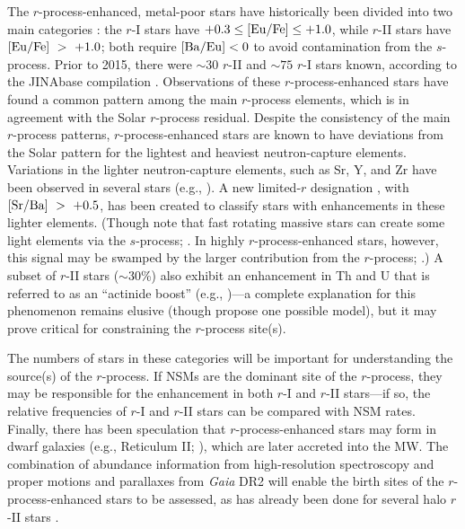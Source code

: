 \documentclass[preprint]{aastex61}
\begin{document}
The $r$-process-enhanced, metal-poor stars have historically been
divided into two main categories \citep{BeersChristlieb2005}: the
$r$-I stars have $+0.3\le [\rm{Eu/Fe}]\le +1.0$, while $r$-II stars
have $[\rm{Eu/Fe}]~>~+1.0$; both require $[\rm{Ba/Eu}]<0$ to avoid
contamination from the $s$-process.  Prior to 2015, there were
$\sim30$ $r$-II and $\sim 75$ $r$-I stars known, according to the
JINAbase compilation \citep{Abohalima2017}.  Observations of
these $r$-process-enhanced stars have found a common pattern among the
main $r$-process elements, which is in agreement with the Solar
$r$-process residual.  Despite the consistency of the main $r$-process
patterns, $r$-process-enhanced stars are known to have deviations from
the Solar pattern for the lightest and heaviest neutron-capture
elements.  Variations in the lighter neutron-capture elements, such as
Sr, Y, and Zr have been observed in several stars (e.g.,
\citealt{SiqueiraMello2014,Placco2017,Spite2018}).  A new limited-$r$
designation \citep{Frebel2018}, with $[\rm{Sr/Ba}]~>~+0.5$, has been
created to classify stars with enhancements in these lighter elements.
(Though note that fast rotating massive stars can create some light
elements via the $s$-process;
\citealt{Chiappini2011,Frischknecht2012,Cescutti2013,Frischknecht2016}. In
highly $r$-process-enhanced stars, however, this signal may be swamped
by the larger contribution from the $r$-process; \citealt{Spite2018}.)
A subset of $r$-II stars ($\sim30$\%) also exhibit an enhancement in
Th and U that is referred to as an ``actinide boost'' (e.g.,
\citealt{Hill2002,Mashonkina2014,Holmbeck2018})---a complete
explanation for this phenomenon remains elusive (though
\citealt{Holmbeck2018b} propose one possible model), but it may prove 
critical for constraining the $r$-process site(s).

The numbers of stars in these categories will be important for
understanding the source(s) of the $r$-process.  If NSMs are the
dominant site of the $r$-process, they may be responsible for the
enhancement in both $r$-I and $r$-II stars---if so, the relative
frequencies of $r$-I and $r$-II stars can be compared with NSM rates.
Finally, there has been speculation that $r$-process-enhanced stars
may form in dwarf galaxies (e.g., Reticulum II; \citealt{Ji2016}),
which are later accreted into the MW.  The combination of abundance
information from high-resolution spectroscopy and proper motions and
parallaxes from {\it Gaia} DR2 \citep{GaiaDR2REF} will enable the
birth sites of the $r$-process-enhanced stars to be assessed, as has
already been done for several halo $r$-II stars
\citep{Sakari2018,Roederer2018}.
\end{document}
